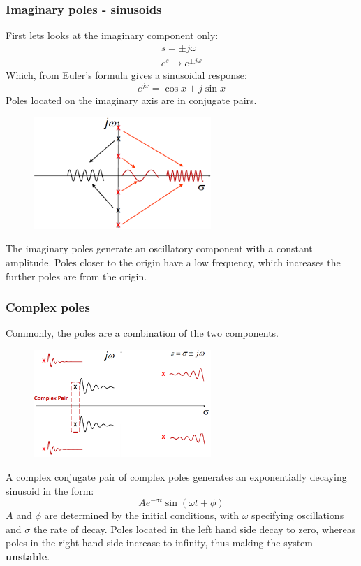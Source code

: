 \documentclass[class=report, crop=false, 12pt,a4paper]{standalone}
\begin{document}
\subsubsection{Imaginary poles - sinusoids}
First lets looks at the imaginary component only:
\begin{gather}
  s = \pm j\omega\\
  e^s \rightarrow e^{\pm j\omega}
\end{gather}
Which, from Euler's formula gives a sinusoidal response:
\begin{equation}
  e^{jx} = \cos{x} + j\sin{x}
\end{equation}
Poles located on the imaginary axis are in conjugate pairs.
\begin{figure}[H]
  \centering
  \includegraphics[width = 0.6\textwidth]{../img/diagram91.png}
\end{figure}
The imaginary poles generate an oscillatory component with a constant amplitude. Poles closer to the origin have a low frequency, which increases the further poles are from the origin.
\subsubsection{Complex poles}
Commonly, the poles are a combination of the two components.
\begin{figure}[H]
  \centering
  \includegraphics[width = 0.6\textwidth]{../img/diagram92.png}
\end{figure}
A complex conjugate pair of complex poles generates an exponentially decaying sinusoid in the form: 
\begin{equation}
  Ae^{-\sigma t}\sin{\left(\omega t + \phi\right)}
\end{equation}
$A$ and $\phi$ are determined by the initial conditions, with $\omega$ specifying oscillations and $\sigma$ the rate of decay. Poles located in the left hand side decay to zero, whereas poles in the right hand side increase to infinity, thus making the system \textbf{unstable}.
\end{document}
